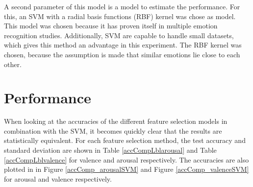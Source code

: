 \npar
A second parameter of this model is a model to estimate the performance. For this, an SVM with a radial basis functions (RBF) kernel was chose as model. This model was chosen because it has proven itself in multiple emotion recognition studies. Additionally, SVM are capable to handle small datasets, which gives this method an advantage in this experiment. The RBF kernel was chosen, because the assumption is made that similar emotions lie close to each other. 

\clearpage

\section{Performance}

When looking at the accuracies of the different feature selection models in combination with the SVM, it becomes quickly clear that the results are statistically equivalent. 
For each feature selection method, the test accuracy and standard deviation are shown in Table \ref{accCompLblarousal} and Table \ref{accCompLblvalence} for valence and arousal respectively. The accuracies are also plotted in in Figure \ref{accComp_arousalSVM} and Figure \ref{accComp_valenceSVM} for arousal and valence respectively.


